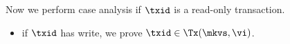 \begin{itemize}
\begin{itemize}
    Now we perform case analysis if \( \txid \) is a read-only transaction.
    \begin{itemize}
        \item if \( \txid \) has write, we prove \( \txid \in \Tx(\mkvs, \vi)\).

\end{itemize}
\end{itemize}
\end{itemize}
